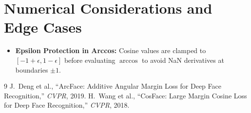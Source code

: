 \documentclass[11pt]{article}
\begin{document}
\section{Numerical Considerations and Edge Cases}
\label{sec:numerical}

\begin{itemize}
    \item \textbf{Epsilon Protection in Arccos:} Cosine values are clamped to $[-1 + \epsilon, 1 - \epsilon]$ before evaluating $\arccos$ to avoid NaN derivatives at boundaries $\pm 1$.
\end{itemize}

\begin{thebibliography}{9}
 J.~Deng et al., ``ArcFace: Additive Angular Margin Loss for Deep Face Recognition,'' \emph{CVPR}, 2019.
 H.~Wang et al., ``CosFace: Large Margin Cosine Loss for Deep Face Recognition,'' \emph{CVPR}, 2018.
\end{thebibliography}
\end{document}
